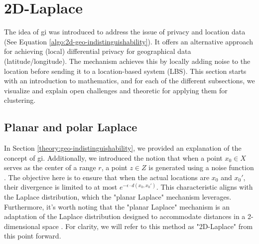 %

\newpage
\section{2D-Laplace}
The idea of \gls{gi} was introduced to address the issue of privacy and location data \citep{DBLP:journals/corr/abs-1212-1984} (See Equation \ref{algo:2d-geo-indistinguishability}).
It offers an alternative approach for achieving (local) differential privacy for geographical data (latitude/longitude).
The mechanism achieves this by locally adding noise to the location before sending it to a location-based system (LBS).
This section starts with an introduction to mathematics, and for each of the different subsections, we visualize and explain open challenges and theoretic for applying them for clustering.
\subsection{Planar and polar Laplace}
In Section \ref{theory:geo-indistinguishability}, we provided an explanation of the concept of \gls{gi}. 
Additionally, we introduced the notion that when a point $x_0 \in X$ serves as the center of a range $r$, a point $z \in Z$ is generated using a noise function \citep{DBLP:journals/corr/abs-1212-1984}. The objective here is to ensure that when the actual locations are $x_0$ and $x_0'$, their divergence is limited to at most $e^{-\epsilon \cdot d(x_0, x_0')}$. This characteristic aligns with the Laplace distribution, which the "planar Laplace" mechanism leverages.
Furthermore, it's worth noting that the "planar Laplace" mechanism is an adaptation of the Laplace distribution designed to accommodate distances in a 2-dimensional space \citep{DBLP:journals/corr/abs-1212-1984}. For clarity, we will refer to this method as "2D-Laplace" from this point forward.

